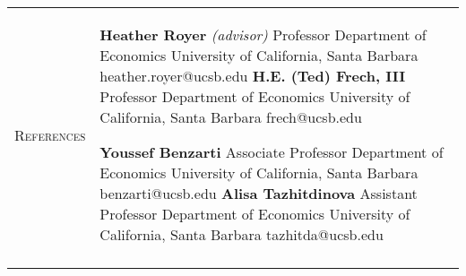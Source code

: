 \documentclass[11pt]{article}
\begin{document}
\begin{tabularx}{\textwidth}{@{}Y Z@{}}
	\newpage 
	\textsc{References}  & 
	\begin{minipage}[t]{0.41\textwidth}
		\textbf{Heather Royer} \textit{(advisor)} \newline
		Professor \newline
		Department of Economics \newline
		University of California, Santa Barbara \newline
		heather.royer@ucsb.edu 
		\vspace{20pt} \newline
		\textbf{H.E. (Ted) Frech, III} \newline
		Professor \newline
		Department of Economics \newline
		University of California, Santa Barbara \newline
		frech@ucsb.edu
	\end{minipage}\begin{minipage}[t]{0.5\textwidth}
		\textbf{Youssef Benzarti}  \newline
		Associate Professor \newline
		Department of Economics \newline
		University of California, Santa Barbara \newline
		benzarti@ucsb.edu
		\vspace{20pt} \newline
		\textbf{Alisa Tazhitdinova} \newline
		Assistant Professor \newline
		Department of Economics \newline
		University of California, Santa Barbara \newline
		tazhitda@ucsb.edu
	\end{minipage}
	\newline  \\ \addlinespace[20pt] 
	

\end{tabularx}
\end{document}
